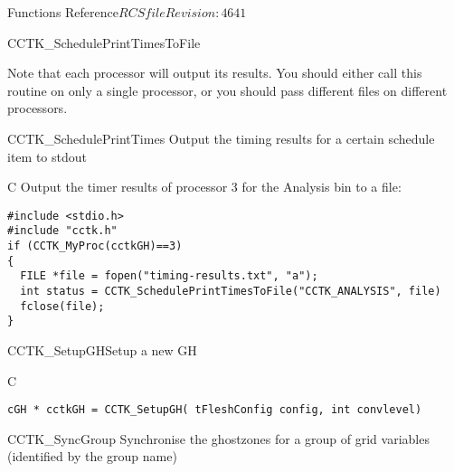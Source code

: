 \begin{cactuspart}{ Functions Reference}{$RCSfile$}{$Revision: 4641 $}
\begin{FunctionDescription}{CCTK\_SchedulePrintTimesToFile}
\begin{Discussion}
    Note that each processor will output its results.  You should
    either call this routine on only a single processor, or you should
    pass different files on different processors.
  \end{Discussion}
  
  \begin{SeeAlsoSection}
    \begin{SeeAlso}{CCTK\_SchedulePrintTimes}
      Output the timing results for a certain schedule item to stdout
    \end{SeeAlso}
  \end{SeeAlsoSection}

  \begin{ExampleSection}
    \begin{Example}{C}
      Output the timer results of processor 3 for the Analysis bin to
      a file:
\begin{verbatim}
#include <stdio.h>
#include "cctk.h"
if (CCTK_MyProc(cctkGH)==3)
{
  FILE *file = fopen("timing-results.txt", "a");
  int status = CCTK_SchedulePrintTimesToFile("CCTK_ANALYSIS", file)
  fclose(file);
}
\end{verbatim}
\end{Example}
  \end{ExampleSection}
  
\end{FunctionDescription}



\begin{FunctionDescription}{CCTK\_SetupGH}{Setup a new GH}
\label{CCTK-SetupGH}
\begin{SynopsisSection}
\begin{Synopsis}{C}
\begin{verbatim}cGH * cctkGH = CCTK_SetupGH( tFleshConfig config, int convlevel)\end{verbatim}
\end{Synopsis}
\end{SynopsisSection}
\end{FunctionDescription}




\begin{FunctionDescription}{CCTK\_SyncGroup}
\label{CCTK-SyncGroup}
Synchronise the ghostzones for a group of grid variables
(identified by the group name)


\end{FunctionDescription}
\end{cactuspart}
